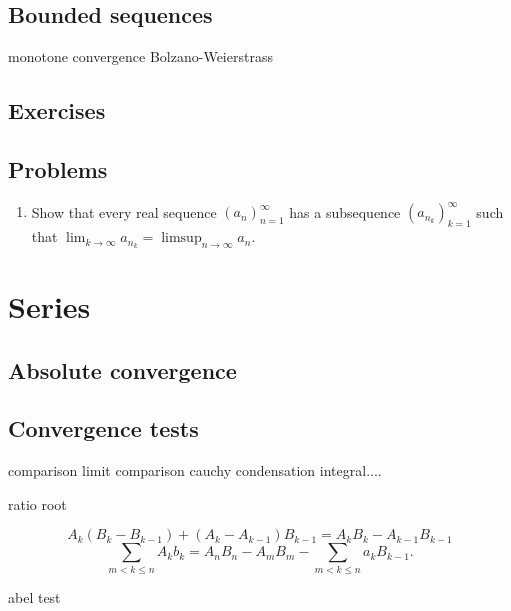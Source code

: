 \documentclass{../note}
\begin{document}
\section{Bounded sequences}
monotone convergence
Bolzano-Weierstrass


\section*{Exercises}
\begin{prb}
\end{prb}
\begin{prb}
\end{prb}
\section*{Problems}
\begin{enumerate}
\item Show that every real sequence $(a_n)_{n=1}^\infty$ has a subsequence $(a_{n_k})_{k=1}^\infty$ such that $\lim_{k\to\infty}a_{n_k}=\limsup_{n\to\infty}a_n$.
\end{enumerate}





\chapter{Series}

\section{Absolute convergence}
\begin{prb}
\end{prb}


\section{Convergence tests}

comparison
limit comparison
cauchy condensation
integral....

ratio
root


\begin{prb}
\[A_k(B_k-B_{k-1})+(A_k-A_{k-1})B_{k-1}=A_kB_k-A_{k-1}B_{k-1}\]
\[\sum_{m<k\le n}A_kb_k=A_nB_n-A_mB_m-\sum_{m<k\le n}a_kB_{k-1}.\]
\end{prb}

abel test
\begin{prb}
\end{prb}
\end{document}
